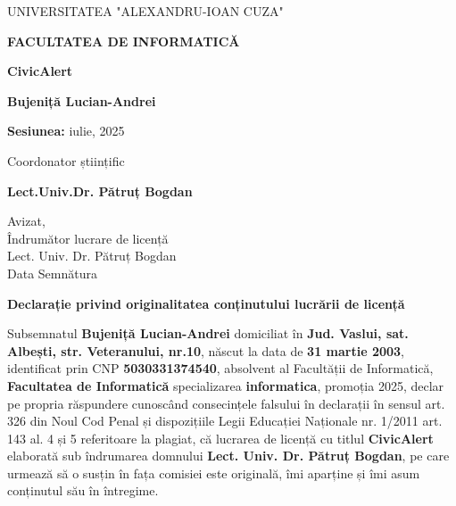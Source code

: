 \documentclass[12pt,a4paper]{report}
\begin{document}
\newpage
\thispagestyle{empty}
\begin{center}
        \large
        \MakeUppercase{Universitatea "Alexandru-Ioan Cuza"}
        
        \LARGE
        \textbf{\MakeUppercase{Facultatea de Informatică}}
        
        \vspace{8cm}
        \huge
        \textbf{CivicAlert}
        
        \vspace{2cm}
        \LARGE
        \textbf{Bujeniță Lucian-Andrei}
        
        \vfill
        \Large
        \textbf{Sesiunea:} iulie, 2025
        
        \vspace{4cm}
        \Large
        Coordonator științific
        
        \vspace{0.5cm}
        \LARGE
        \textbf{Lect.Univ.Dr.  Pătruț Bogdan}
    \end{center}

\newpage
\thispagestyle{empty}
\begin{flushright}
Avizat,\\
Îndrumător lucrare de licență\\
Lect. Univ. Dr.  Pătruț Bogdan\\
Data \makebox[2cm]{\dotfill} Semnătura \makebox[3cm]{\dotfill}\\
\end{flushright}

\vspace{2cm}


\begin{center}
    \large
    \textbf{Declarație privind originalitatea conținutului lucrării de licență}
\end{center}

Subsemnatul \textbf{Bujeniță Lucian-Andrei} domiciliat în \textbf{Jud. Vaslui, sat. Albești, str. Veteranului, nr.10}, născut la data de \textbf{31 martie 2003}, identificat prin CNP \textbf{5030331374540}, absolvent al Facultății de Informatică, \textbf{Facultatea de Informatică} specializarea \textbf{informatica}, promoția 2025, declar pe propria răspundere cunoscând consecințele falsului în declarații în sensul art. 326 din Noul Cod Penal și dispozițiile Legii Educației Naționale nr. 1/2011 art. 143 al. 4 și 5 referitoare la plagiat, că lucrarea de licență cu titlul \textbf{CivicAlert} elaborată sub îndrumarea domnului \textbf{Lect. Univ. Dr.  Pătruț Bogdan}, pe care urmează să o susțin în fața comisiei este originală, îmi aparține și îmi asum conținutul său în întregime.
\end{document}
